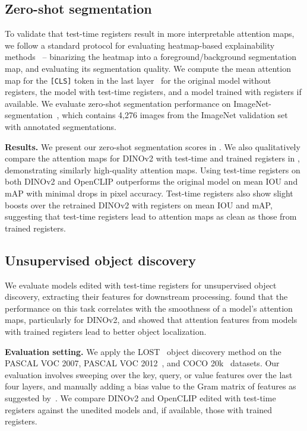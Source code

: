 \documentclass{article}
\begin{document}
\subsection{Zero-shot segmentation}
 To validate that test-time registers result in more interpretable attention maps, we follow a standard protocol for evaluating heatmap-based explainability methods~\citep{NEURIPS2019_fe4b8556} -- binarizing the heatmap into a foreground/background segmentation map, and evaluating its segmentation quality. We compute the mean attention map for the \texttt{[CLS]} token in the last layer~\citep{Chefer_2021_CVPR} for the original model without registers, the model with test-time registers, and a model trained with registers if available. We evaluate zero-shot segmentation performance on ImageNet-segmentation~\citep{imagenetseg}, which contains 4,276 images from the ImageNet validation set with annotated segmentations. 

\textbf{Results.} We present our zero-shot segmentation scores in . We also qualitatively compare the attention maps for DINOv2 with test-time and trained registers in , demonstrating similarly high-quality attention maps. Using test-time registers on both DINOv2 and OpenCLIP outperforms the original model on mean IOU and mAP with minimal drops in pixel accuracy. Test-time registers also show slight boosts over the retrained DINOv2 with registers on mean IOU and mAP, suggesting that test-time registers lead to attention maps as clean as those from trained registers. 




\subsection{Unsupervised object discovery}

We evaluate models edited with test-time registers for unsupervised object discovery, extracting their features for downstream processing. \cite{darcet2024vision} found that the performance on this task correlates with the smoothness of a model's attention maps, particularly for DINOv2, and showed that attention features from models with trained registers lead to better object localization.

\textbf{Evaluation setting.} We apply the LOST~\citep{lost} object discovery method on the PASCAL VOC 2007, PASCAL VOC 2012~\citep{pascal}, and COCO 20k~\citep{coco} datasets. Our evaluation involves sweeping over the key, query, or value features over the last four layers, and manually adding a bias value to the Gram matrix of features as suggested by~\cite{darcet2024vision}. We compare DINOv2 and OpenCLIP edited with test-time registers against the unedited models and, if available, those with trained registers.
\end{document}
